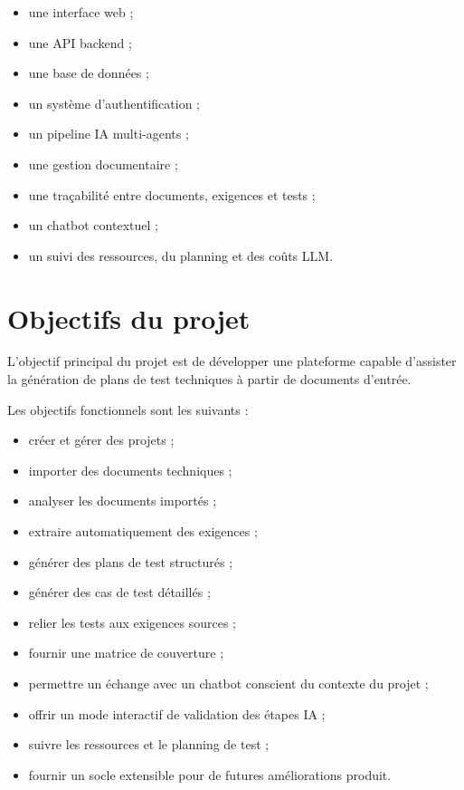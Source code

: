 \documentclass[
  french,
]{report}
\providecommand{\tightlist}{%
  \setlength{\itemsep}{0pt}\setlength{\parskip}{0pt}}
\begin{document}
\begin{itemize}
\tightlist
\item
  une interface web ;
\item
  une API backend ;
\item
  une base de données ;
\item
  un système d'authentification ;
\item
  un pipeline IA multi-agents ;
\item
  une gestion documentaire ;
\item
  une traçabilité entre documents, exigences et tests ;
\item
  un chatbot contextuel ;
\item
  un suivi des ressources, du planning et des coûts LLM.
\end{itemize}

\chapter{Objectifs du projet}\label{objectifs-du-projet}

L'objectif principal du projet est de développer une plateforme capable
d'assister la génération de plans de test techniques à partir de
documents d'entrée.

Les objectifs fonctionnels sont les suivants :

\begin{itemize}
\tightlist
\item
  créer et gérer des projets ;
\item
  importer des documents techniques ;
\item
  analyser les documents importés ;
\item
  extraire automatiquement des exigences ;
\item
  générer des plans de test structurés ;
\item
  générer des cas de test détaillés ;
\item
  relier les tests aux exigences sources ;
\item
  fournir une matrice de couverture ;
\item
  permettre un échange avec un chatbot conscient du contexte du projet ;
\item
  offrir un mode interactif de validation des étapes IA ;
\item
  suivre les ressources et le planning de test ;
\item
  fournir un socle extensible pour de futures améliorations produit.
\end{itemize}
\end{document}
